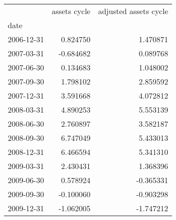 \begin{tabular}{lrr}
\toprule
{} &  assets cycle &  adjusted assets cycle \\
date       &               &                        \\
\midrule
2006-12-31 &      0.824750 &               1.470871 \\
2007-03-31 &     -0.684682 &               0.089768 \\
2007-06-30 &      0.134683 &               1.048002 \\
2007-09-30 &      1.798102 &               2.859592 \\
2007-12-31 &      3.591668 &               4.072812 \\
2008-03-31 &      4.890253 &               5.553139 \\
2008-06-30 &      2.760897 &               3.582187 \\
2008-09-30 &      6.747049 &               5.433013 \\
2008-12-31 &      6.466594 &               5.341310 \\
2009-03-31 &      2.430431 &               1.368396 \\
2009-06-30 &      0.578924 &              -0.365331 \\
2009-09-30 &     -0.100060 &              -0.903298 \\
2009-12-31 &     -1.062005 &              -1.747212 \\
\bottomrule
\end{tabular}
